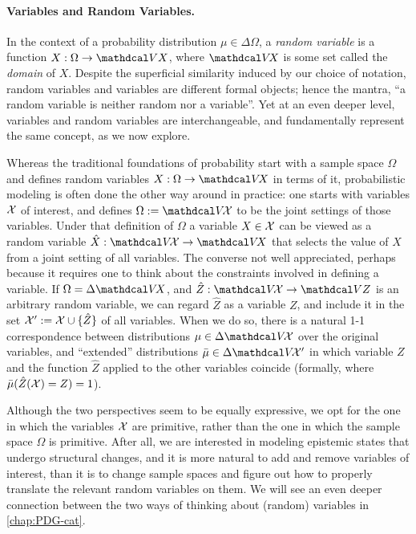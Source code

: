\paragraph{Variables and Random Variables.}
    \label{sec:var-randomvar}
In the context of a probability distribution $\mu \in \Delta \Omega$,
a \emph{random variable} is a function $X : \Omega \to \V X$, where $\V\! X$ is some set called the \emph{domain} of $X$.
Despite the superficial similarity induced by our choice of notation, random variables and variables are different formal objects;
    hence the mantra, 
    ``a random variable is neither random nor a variable''. 
Yet at an even deeper level, variables and random variables are interchangeable, and fundamentally represent the same concept, as we now explore. 

Whereas the traditional foundations of probability start with a sample space $\Omega$ and defines random variables $X : \Omega \to \V\!X$ in terms of it, 
probabilistic modeling is often done the other way around in practice: one starts with variables $\mathcal X$ of interest, and defines $\Omega := \V\!\X$ to be the joint settings of those variables. 
Under that definition of $\Omega$ a variable $X \in \mathcal X$ can be viewed as a random variable $\hat X : \V\!\X \to \V\!X$ that selects the value of $X$ from a joint setting of all variables.  
The converse not well appreciated, 
    perhaps because it requires one to think about
    the constraints involved in defining a variable.
If $\Omega = \Delta \V\!X$, and  
    $\hat Z : \V\!\X \to \V Z$
    is an arbitrary random variable, 
    we can regard $\hat Z$ as a variable $Z$, and include it in the set $\mathcal X' := \mathcal X \cup \{ \hat Z \}$ of all variables.
When we do so,  
there is a natural 1-1 correspondence between distributions $\mu \in \Delta \V\!\X$ over the original variables, and ``extended'' distributions 
$\bar\mu \in \Delta \V\!\X'$ in which variable $Z$ and the function $\hat Z$ applied to the other variables coincide (formally, where $\bar\mu(\hat Z(\mathcal X) = Z)=1$).

%
Although the two perspectives seem to be equally expressive, we opt for the one in which the variables $\mathcal X$ are primitive, rather than the one in which the sample space $\Omega$ is primitive. 
After all, we are interested in modeling epistemic states that undergo structural changes, and it is more natural to add and remove variables of interest, than it is to change sample spaces and figure out how to properly translate the relevant random variables on them.  
We will see an even deeper connection between the two ways of thinking about (random) variables in \cref{chap:PDG-cat}.

